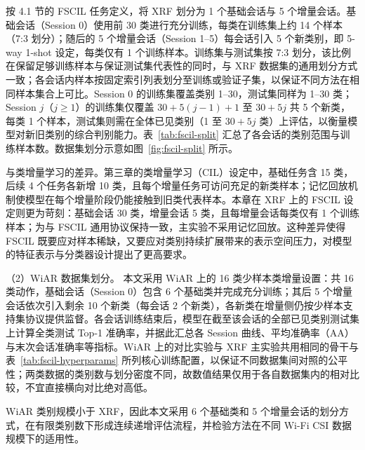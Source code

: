 按 4.1 节的 FSCIL 任务定义，将 XRF 划分为 1 个基础会话与 5 个增量会话。基础会话（Session 0）使用前 30 类进行充分训练，每类在训练集上约 14 个样本（7:3 划分）；随后的 5 个增量会话（Session 1–5）每会话引入 5 个新类别，即 5-way 1-shot 设定，每类仅有 1 个训练样本。训练集与测试集按 7:3 划分，该比例在保留足够训练样本与保证测试集代表性的同时，与 XRF 数据集的通用划分方式一致；各会话内样本按固定索引列表划分至训练或验证子集，以保证不同方法在相同样本集合上可比。Session 0 的训练集覆盖类别 1--30，测试集同样为 1--30 类；Session $j$（$j \geq 1$）的训练集仅覆盖 $30+5(j-1)+1$ 至 $30+5j$ 共 5 个新类，每类 1 个样本，测试集则需在全体已见类别（1 至 $30+5j$ 类）上评估，以衡量模型对新旧类别的综合判别能力。表~\ref{tab:fscil-split} 汇总了各会话的类别范围与训练样本数。数据集划分示意如图~\ref{fig:fscil-split} 所示。

与类增量学习的差异。第三章的类增量学习（CIL）设定中，基础任务含 15 类，后续 4 个任务各新增 10 类，且每个增量任务可访问充足的新类样本；记忆回放机制使模型在每个增量阶段仍能接触到旧类代表样本。本章在 XRF 上的 FSCIL 设定则更为苛刻：基础会话 30 类，增量会话 5 类，且每增量会话每类仅有 1 个训练样本；为与 FSCIL 通用协议保持一致，主实验不采用记忆回放。这种差异使得 FSCIL 既要应对样本稀缺，又要应对类别持续扩展带来的表示空间压力，对模型的特征表示与分类器设计提出了更高要求。

（2）WiAR 数据集划分。 本文采用 WiAR 上的 16 类少样本类增量设置\cite{guo2019wiar}：共 16 类动作，基础会话（Session 0）包含 6 个基础类并完成充分训练；其后 5 个增量会话依次引入剩余 10 个新类（每会话 2 个新类），各新类在增量侧仍按少样本支持集协议提供监督。各会话训练结束后，模型在截至该会话的全部已见类别测试集上计算全类测试 Top-1 准确率，并据此汇总各 Session 曲线、平均准确率（AA）与末次会话准确率等指标。WiAR 上的对比实验与 XRF 主实验共用相同的骨干与表~\ref{tab:fscil-hyperparams} 所列核心训练配置，以保证不同数据集间对照的公平性；两类数据的类别数与划分密度不同，故数值结果仅用于各自数据集内的相对比较，不宜直接横向对比绝对高低。

WiAR 类别规模小于 XRF，因此本文采用 6 个基础类和 5 个增量会话的划分方式，在有限类别数下形成连续递增评估流程，并检验方法在不同 Wi-Fi CSI 数据规模下的适用性。

